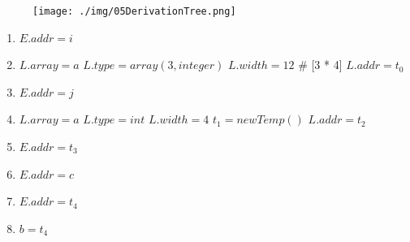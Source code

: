 \documentclass[11pt]{article}
\begin{document}
\begin{center}
  \begin{minipage}[t]{\linewidth}
    \begin{multicols}{3}
      \begin{figure}[H]
        \texttt{[image: ./img/05DerivationTree.png]}
      \end{figure}
      \begin{enumerate}
        \small 
        \item $E.addr = i$
        \item $L.array = a$ 
        \newline $L.type = array(3, integer)$
        \newline $L.width = 12$ {\color{teal} \quad \# [3 * 4]}
        \newline $L.addr = t_0$
        \item $E.addr = j$
        \item $L.array = a$
        \newline $L.type = int$
        \newline $L.width = 4$
        \newline $t_1 = newTemp()$
        \newline $L.addr = t_2$
        \item $E.addr = t_3$
        \item $E.addr = c$
        \item $E.addr = t_4$
        \item {\color{red} $b = t_4$}
      \end{enumerate}
    \end{multicols}
  \end{minipage}
\end{center}
\end{document}
